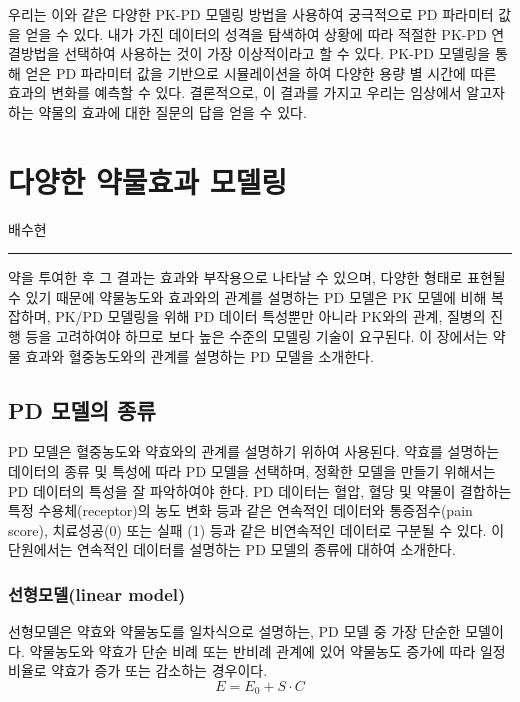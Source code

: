 \documentclass[
  10pt,
  krantz2,
  a4paper]{krantz}
\theoremstyle{definition}
\theoremstyle{definition}
\theoremstyle{definition}
\theoremstyle{remark}
\begin{document}
우리는 이와 같은 다양한 PK-PD 모델링 방법을 사용하여 궁극적으로 PD 파라미터 값을 얻을 수 있다. 내가 가진 데이터의 성격을 탐색하여 상황에 따라 적절한 PK-PD 연결방법을 선택하여 사용하는 것이 가장 이상적이라고 할 수 있다. PK-PD 모델링을 통해 얻은 PD 파라미터 값을 기반으로 시뮬레이션을 하여 다양한 용량 별 시간에 따른 효과의 변화를 예측할 수 있다. 결론적으로, 이 결과를 가지고 우리는 임상에서 알고자 하는 약물의 효과에 대한 질문의 답을 얻을 수 있다.

\hypertarget{effect-model}{%
\chapter{다양한 약물효과 모델링}\label{effect-model}}

배수현

\begin{center}\rule{0.5\linewidth}{0.5pt}\end{center}

약을 투여한 후 그 결과는 효과와 부작용으로 나타날 수 있으며, 다양한 형태로 표현될 수 있기 때문에 약물농도와 효과와의 관계를 설명하는 PD 모델은 PK 모델에 비해 복잡하며, PK/PD 모델링을 위해 PD 데이터 특성뿐만 아니라 PK와의 관계, 질병의 진행 등을 고려하여야 하므로 보다 높은 수준의 모델링 기술이 요구된다. 이 장에서는 약물 효과와 혈중농도와의 관계를 설명하는 PD 모델을 소개한다.

\hypertarget{pd-model}{%
\section{PD 모델의 종류}\label{pd-model}}

PD 모델은 혈중농도와 약효와의 관계를 설명하기 위하여 사용된다. 약효를 설명하는 데이터의 종류 및 특성에 따라 PD 모델을 선택하며, 정확한 모델을 만들기 위해서는 PD 데이터의 특성을 잘 파악하여야 한다. PD 데이터는 혈압, 혈당 및 약물이 결합하는 특정 수용체(receptor)의 농도 변화 등과 같은 연속적인 데이터와 통증점수(pain score), 치료성공(0) 또는 실패 (1) 등과 같은 비연속적인 데이터로 구분될 수 있다. 이 단원에서는 연속적인 데이터를 설명하는 PD 모델의 종류에 대하여 소개한다.

\hypertarget{uxc120uxd615uxbaa8uxb378linear-model}{%
\subsection{선형모델(linear model)}\label{uxc120uxd615uxbaa8uxb378linear-model}}

선형모델은 약효와 약물농도를 일차식으로 설명하는, PD 모델 중 가장 단순한 모델이다. 약물농도와 약효가 단순 비례 또는 반비례 관계에 있어 약물농도 증가에 따라 일정 비율로 약효가 증가 또는 감소하는 경우이다.
\begin{equation}
E = E_0 + S \cdot C
\label{eq:linear}
\end{equation}
\end{document}
